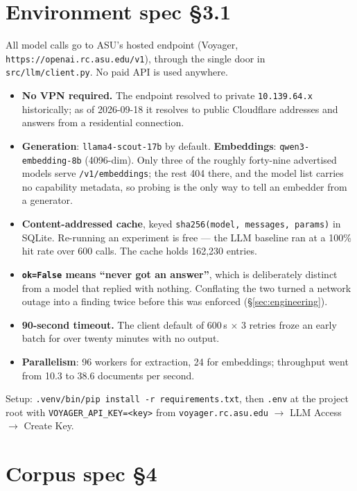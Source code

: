 \documentclass[12pt,a4paper]{article}
\newcommand{\code}[1]{\texttt{\small #1}}
\newcommand{\spec}[1]{\textbf{spec §#1}}
\begin{document}
\section{Environment \spec{3.1}}\label{sec:env}

All model calls go to ASU's hosted endpoint (Voyager, \code{https://openai.rc.asu.edu/v1}), through
the single door in \code{src/llm/client.py}. No paid API is used anywhere.

\begin{itemize}
\item \textbf{No VPN required.} The endpoint resolved to private \code{10.139.64.x} historically;
as of 2026-09-18 it resolves to public Cloudflare addresses and answers from a residential
connection.
\item \textbf{Generation}: \code{llama4-scout-17b} by default. \textbf{Embeddings}:
\code{qwen3-embedding-8b} (4096-dim). Only three of the roughly forty-nine advertised models serve
\code{/v1/embeddings}; the rest 404 there, and the model list carries no capability metadata, so
probing is the only way to tell an embedder from a generator.
\item \textbf{Content-addressed cache}, keyed \code{sha256(model, messages, params)} in SQLite.
Re-running an experiment is free --- the LLM baseline ran at a 100\% hit rate over 600 calls. The
cache holds 162,230 entries.
\item \textbf{\code{ok=False} means ``never got an answer''}, which is deliberately distinct from a
model that replied with nothing. Conflating the two turned a network outage into a finding twice
before this was enforced (§\ref{sec:engineering}).
\item \textbf{90-second timeout.} The client default of 600\,s $\times$ 3 retries froze an early
batch for over twenty minutes with no output.
\item \textbf{Parallelism}: 96 workers for extraction, 24 for embeddings; throughput went from 10.3
to 38.6 documents per second.
\end{itemize}

Setup: \code{.venv/bin/pip install -r requirements.txt}, then \code{.env} at the project root with
\code{VOYAGER\_API\_KEY=<key>} from \code{voyager.rc.asu.edu} $\rightarrow$ LLM Access $\rightarrow$
Create Key.

\section{Corpus \spec{4}}\label{sec:corpus}
\end{document}
